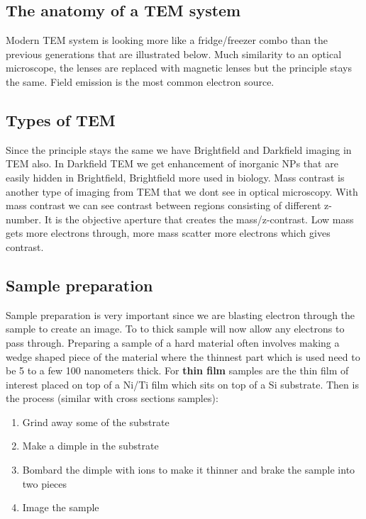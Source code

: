 	\subsection*{The anatomy of a TEM system}
	Modern TEM system is looking more like a fridge/freezer combo than the previous generations that are illustrated below. Much similarity to an optical microscope, the lenses are replaced with magnetic lenses but the principle stays the same. Field emission is the most common electron source. 


	\subsection*{Types of TEM}
	Since the principle stays the same we have Brightfield and Darkfield imaging in TEM also. In Darkfield TEM we get enhancement of inorganic NPs that are easily hidden in Brightfield, Brightfield more used in biology. Mass contrast is another type of imaging from TEM that we dont see in optical microscopy. With mass contrast we can see contrast between regions consisting of different z-number. It is the objective aperture that creates the mass/z-contrast. Low mass gets more electrons through, more mass scatter more electrons which gives contrast. 

	\subsection*{Sample preparation}
	Sample preparation is very important since we are blasting electron through the sample to create an image. To to thick sample will now allow any electrons to pass through. Preparing a sample of a hard material often involves making a wedge shaped piece of the material where the thinnest part which is used need to be 5 to a few 100 nanometers thick. For \textbf{thin film} samples are the thin film of interest placed on top of a Ni/Ti film which sits on top of a Si substrate. Then is the process (similar with cross sections samples):

		\begin{enumerate}
		  	\item Grind away some of the substrate 
		  	\item Make a dimple in the substrate
		  	\item Bombard the dimple with ions to make it thinner and brake the sample into two pieces
		  	\item Image the sample
		\end{enumerate}  
	  
